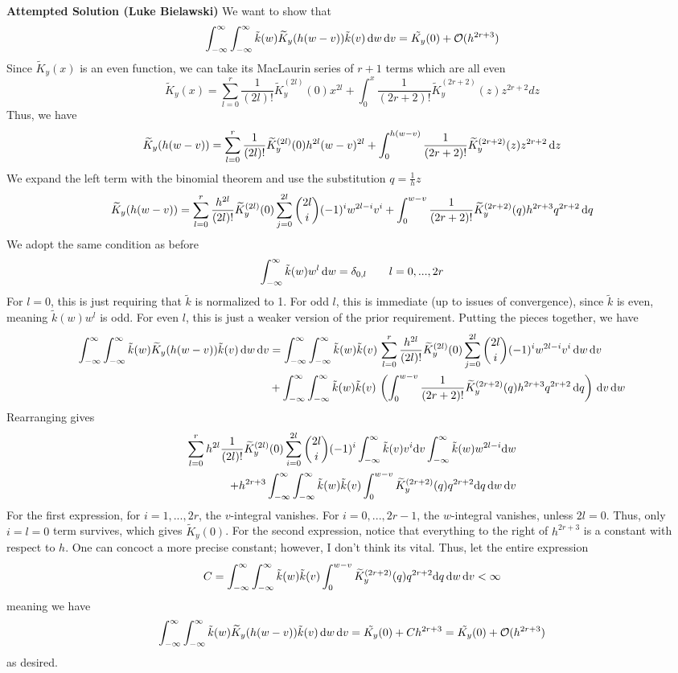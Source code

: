 \documentclass[letterpaper]{amsart}
\newcommand{\tKY}{\widetilde{K}_y}
\newcommand{\tk}{\tilde{k}}
\begin{document}
\textbf{Attempted Solution (Luke Bielawski)}
We want to show that
\[
\int_{-\infty}^\infty \int_{-\infty}^\infty \tk(w) \tKY(h(w-v)) \tk(v) \, \dif w \, \dif v = \tilde{K_y}(0) + \Order(h^{2r+3})
\]
Since $\tKY(x)$ is an even function, we can take its MacLaurin series of $r+1$ terms which are all even
\[
\tKY(x) = \sum_{l=0}^r \frac{1}{(2l)!}\tKY^{(2l)}(0) x^{2l} + \int_0^x \frac{1}{(2r+2)!}\tKY^{(2r+2)}(z) z^{2r+2}dz
\]
Thus, we have
\[
\tKY(h(w-v)) = \sum_{l=0}^r \frac{1}{(2l)!}\tKY^{(2l)}(0) h^{2l}(w-v)^{2l} + \int_0^{h(w-v)} \frac{1}{(2r+2)!}\tKY^{(2r+2)}(z) z^{2r+2} \, \dif z
\]
We expand the left term with the binomial theorem and use the substitution $q = \frac{1}{h}z$
\[
\tKY(h(w-v)) = \sum_{l=0}^r \frac{h^{2l}}{(2l)!}\tKY^{(2l)}(0) \sum_{j=0}^{2l}\binom{2l}{i}(-1)^iw^{2l-i}v^i + \int_0^{w-v} \frac{1}{(2r+2)!}\tKY^{(2r+2)}(q) h^{2r+3}q^{2r+2} \,\dif q
\]
We adopt the same condition as before 
\[
\int_{-\infty}^\infty \tk(w)w^l \, \dif w = \delta_{0, l} \qquad  l = 0, ..., 2r
\]
For $l = 0$, this is just requiring that $\tk$ is normalized to 1. For odd $l$, this is immediate (up to issues of convergence), since $\tk$ is even, meaning $\tk(w)w^l$ is odd. For even $l$, this is just a weaker version of the prior requirement. Putting the pieces together, we have
\begin{align*}
    \int_{-\infty}^\infty \int_{-\infty}^\infty \tk(w) \tKY(h(w-v)) \tk(v) \, \dif w \, \dif v &= \int_{-\infty}^\infty \int_{-\infty}^\infty \tk(w) \tk(v) \, \sum_{l=0}^r \frac{h^{2l}}{(2l)!}\tKY^{(2l)}(0) \sum_{j=0}^{2l}\binom{2l}{i}(-1)^iw^{2l-i}v^i \, \dif w \, \dif v \\
    &+ \int_{-\infty}^\infty \int_{-\infty}^\infty \tk(w) \tk(v) \,\left(\int_0^{w-v} \frac{1}{(2r+2)!}\tKY^{(2r+2)}(q) h^{2r+3}q^{2r+2} \,\dif q\right) \, \dif v \, \dif w
\end{align*}
Rearranging gives
\begin{align*}
    \sum_{l=0}^r h^{2l}\frac{1}{(2l)!}\tKY^{(2l)}(0) \sum_{i=0}^{2l}\binom{2l}{i}(-1)^i \int_{-\infty}^\infty  \tk(v) v^i \dif v\int_{-\infty}^\infty \tk(w) w^{2l-i} \dif w \\
    + h^{2r+3} \int_{-\infty}^\infty \int_{-\infty}^\infty \tk(w) \tk(v) \int_0^{w-v}
 \tKY^{(2r+2)}(q)q^{2r+2} \dif q \, \dif w \, \dif v
\end{align*}
For the first expression, for $i = 1, ..., 2r$, the $v$-integral vanishes. For $i = 0, ..., 2r-1$, the $w$-integral vanishes, unless $2l = 0$. Thus, only $i = l = 0$ term survives, which gives $\tKY(0)$. For the second expression, notice that everything to the right of $h^{2r+3}$ is a constant with respect to $h$. One can concoct a more precise constant; however, I don't think its vital. Thus, let the entire expression
\[
C = \int_{-\infty}^\infty \int_{-\infty}^\infty \tk(w) \tk(v) \int_0^{w-v}
 \tKY^{(2r+2)}(q)q^{2r+2} \dif q \, \dif w \, \dif v < \infty
\]
meaning we have
\[
    \int_{-\infty}^\infty \int_{-\infty}^\infty \tk(w) \tKY(h(w-v)) \tk(v) \, \dif w \, \dif v = \tilde{K_y}(0) + Ch^{2r+3} = \tilde{K_y}(0) + \Order(h^{2r+3})
\]
as desired.
\end{document}
